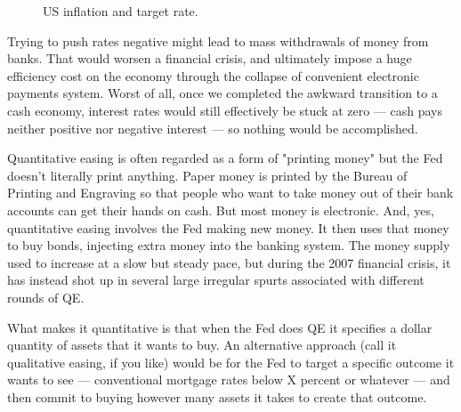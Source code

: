 \begin{figure}
    \caption{US inflation and target rate. }
    \label{fig:cpi_ffr}
\end{figure}

Trying to push rates negative might lead to mass withdrawals of money from banks. That would worsen a financial crisis, and ultimately impose a huge efficiency cost on the economy through the collapse of convenient electronic payments system. Worst of all, once we completed the awkward transition to a cash economy, interest rates would still effectively be stuck at zero — cash pays neither positive nor negative interest — so nothing would be accomplished.

Quantitative easing is often regarded as a form of "printing money" but the Fed doesn't literally print anything. Paper money is printed by the Bureau of Printing and Engraving so that people who want to take money out of their bank accounts can get their hands on cash. But most money is electronic. And, yes, quantitative easing involves the Fed making new money. It then uses that money to buy bonds, injecting extra money into the banking system. The money supply used to increase at a slow but steady pace, but during the 2007 financial crisis, it has instead shot up in several large irregular spurts associated with different rounds of QE. 

What makes it quantitative is that when the Fed does QE it specifies a dollar quantity of assets that it wants to buy. An alternative approach (call it qualitative easing, if you like) would be for the Fed to target a specific outcome it wants to see — conventional mortgage rates below X percent or whatever — and then commit to buying however many assets it takes to create that outcome.


